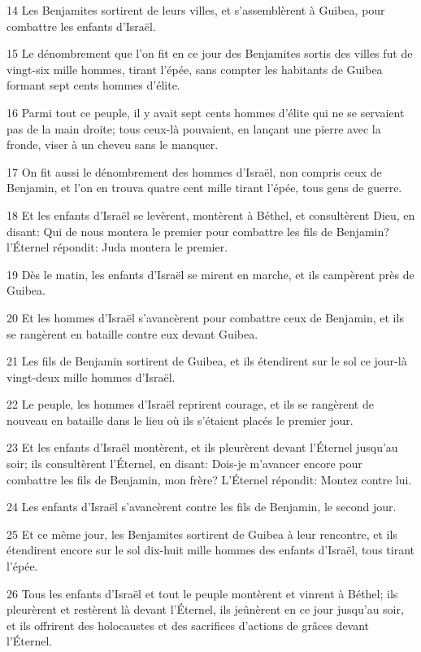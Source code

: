 \par 14 Les Benjamites sortirent de leurs villes, et s'assemblèrent à Guibea, pour combattre les enfants d'Israël.
\par 15 Le dénombrement que l'on fit en ce jour des Benjamites sortis des villes fut de vingt-six mille hommes, tirant l'épée, sans compter les habitants de Guibea formant sept cents hommes d'élite.
\par 16 Parmi tout ce peuple, il y avait sept cents hommes d'élite qui ne se servaient pas de la main droite; tous ceux-là pouvaient, en lançant une pierre avec la fronde, viser à un cheveu sans le manquer.
\par 17 On fit aussi le dénombrement des hommes d'Israël, non compris ceux de Benjamin, et l'on en trouva quatre cent mille tirant l'épée, tous gens de guerre.
\par 18 Et les enfants d'Israël se levèrent, montèrent à Béthel, et consultèrent Dieu, en disant: Qui de nous montera le premier pour combattre les fils de Benjamin? l'Éternel répondit: Juda montera le premier.
\par 19 Dès le matin, les enfants d'Israël se mirent en marche, et ils campèrent près de Guibea.
\par 20 Et les hommes d'Israël s'avancèrent pour combattre ceux de Benjamin, et ils se rangèrent en bataille contre eux devant Guibea.
\par 21 Les fils de Benjamin sortirent de Guibea, et ils étendirent sur le sol ce jour-là vingt-deux mille hommes d'Israël.
\par 22 Le peuple, les hommes d'Israël reprirent courage, et ils se rangèrent de nouveau en bataille dans le lieu où ils s'étaient placés le premier jour.
\par 23 Et les enfants d'Israël montèrent, et ils pleurèrent devant l'Éternel jusqu'au soir; ils consultèrent l'Éternel, en disant: Dois-je m'avancer encore pour combattre les fils de Benjamin, mon frère? L'Éternel répondit: Montez contre lui.
\par 24 Les enfants d'Israël s'avancèrent contre les fils de Benjamin, le second jour.
\par 25 Et ce même jour, les Benjamites sortirent de Guibea à leur rencontre, et ils étendirent encore sur le sol dix-huit mille hommes des enfants d'Israël, tous tirant l'épée.
\par 26 Tous les enfants d'Israël et tout le peuple montèrent et vinrent à Béthel; ils pleurèrent et restèrent là devant l'Éternel, ils jeûnèrent en ce jour jusqu'au soir, et ils offrirent des holocaustes et des sacrifices d'actions de grâces devant l'Éternel.
